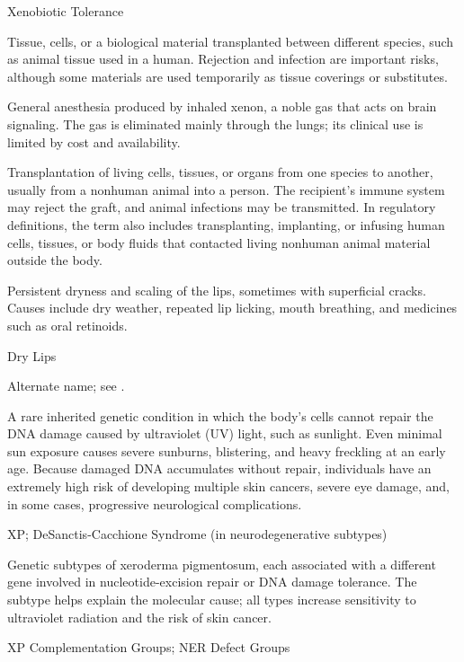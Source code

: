 \synonyms
Xenobiotic Tolerance

 Tissue, cells, or a biological material transplanted between different species, such as animal tissue used in a human. Rejection and infection are important risks, although some materials are used temporarily as tissue coverings or substitutes.

 General anesthesia produced by inhaled xenon, a noble gas that acts on brain signaling. The gas is eliminated mainly through the lungs; its clinical use is limited by cost and availability.

 Transplantation of living cells, tissues, or organs from one species to another, usually from a nonhuman animal into a person. The recipient’s immune system may reject the graft, and animal infections may be transmitted. In regulatory definitions, the term also includes transplanting, implanting, or infusing human cells, tissues, or body fluids that contacted living nonhuman animal material outside the body.

 Persistent dryness and scaling of the lips, sometimes with superficial cracks. Causes include dry weather, repeated lip licking, mouth breathing, and medicines such as oral retinoids.

\synonyms
Dry Lips

 Alternate name; see .

 A rare inherited genetic condition in which the body's cells cannot repair the DNA damage caused by ultraviolet (UV) light, such as sunlight. Even minimal sun exposure causes severe sunburns, blistering, and heavy freckling at an early age. Because damaged DNA accumulates without repair, individuals have an extremely high risk of developing multiple skin cancers, severe eye damage, and, in some cases, progressive neurological complications.

\synonyms
XP; DeSanctis-Cacchione Syndrome (in neurodegenerative subtypes)

 Genetic subtypes of xeroderma pigmentosum, each associated with a different gene involved in nucleotide-excision repair or DNA damage tolerance. The subtype helps explain the molecular cause; all types increase sensitivity to ultraviolet radiation and the risk of skin cancer.

\synonyms
XP Complementation Groups; NER Defect Groups

